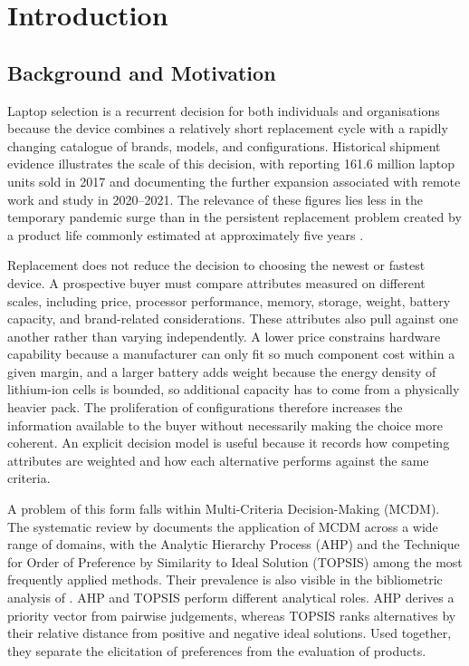 \chapter{Introduction}\label{ch:introduction}

\section{Background and Motivation}\label{sec:background}

Laptop selection is a recurrent decision for both individuals and organisations because the
device combines a relatively short replacement cycle with a rapidly changing catalogue of
brands, models, and configurations. Historical shipment evidence illustrates the scale of this
decision, with \textcite{sonmez_cakir_determination_2020} reporting 161.6 million laptop units
sold in 2017 and \textcite{gaur_application_2023} documenting the further expansion associated
with remote work and study in 2020--2021. The relevance of these figures lies less in the
temporary pandemic surge than in the persistent replacement problem created by a product life
commonly estimated at approximately five years \parencite{sonmez_cakir_determination_2020}.

Replacement does not reduce the decision to choosing the newest or fastest device. A prospective
buyer must compare attributes measured on different scales, including price, processor
performance, memory, storage, weight, battery capacity, and brand-related considerations. These
attributes also pull against one another rather than varying independently. A lower price
constrains hardware capability because a manufacturer can only fit so much component cost within
a given margin, and a larger battery adds weight because the energy density of lithium-ion cells
is bounded, so additional capacity has to come from a physically heavier pack. The proliferation
of configurations therefore increases the information available to the buyer without necessarily
making the choice more coherent. An explicit decision model is useful because it records how
competing attributes are weighted and how each alternative performs against the same criteria.

A problem of this form falls within Multi-Criteria Decision-Making (MCDM). The systematic review
by \textcite{basilio_systematic_2022} documents the application of MCDM across a wide range of
domains, with the Analytic Hierarchy Process (AHP) and the Technique for Order of Preference by
Similarity to Ideal Solution (TOPSIS) among the most frequently applied methods. Their prevalence
is also visible in the bibliometric analysis of \textcite{zyoud_bibliometric-based_2017}. AHP and
TOPSIS perform different analytical roles. AHP derives a priority vector from pairwise
judgements, whereas TOPSIS ranks alternatives by their relative distance from positive and
negative ideal solutions. Used together, they separate the elicitation of preferences from the
evaluation of products.

